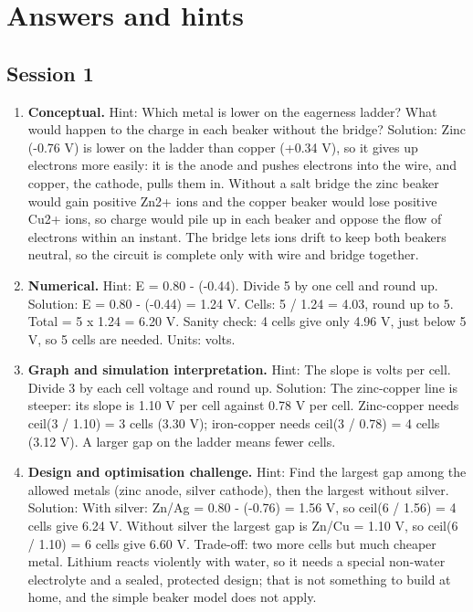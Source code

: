 \documentclass[11pt,a4paper]{article}
\begin{document}
\section{Answers and hints}

\subsection*{Session 1}
\begin{enumerate}[nosep]
\item \textbf{Conceptual.} Hint: Which metal is lower on the eagerness ladder? What would happen to the charge in each beaker without the bridge? Solution: Zinc (-0.76 V) is lower on the ladder than copper (+0.34 V), so it gives up electrons more easily: it is the anode and pushes electrons into the wire, and copper, the cathode, pulls them in. Without a salt bridge the zinc beaker would gain positive Zn2+ ions and the copper beaker would lose positive Cu2+ ions, so charge would pile up in each beaker and oppose the flow of electrons within an instant. The bridge lets ions drift to keep both beakers neutral, so the circuit is complete only with wire and bridge together.
\item \textbf{Numerical.} Hint: E = 0.80 - (-0.44). Divide 5 by one cell and round up. Solution: E = 0.80 - (-0.44) = 1.24 V. Cells: 5 / 1.24 = 4.03, round up to 5. Total = 5 x 1.24 = 6.20 V. Sanity check: 4 cells give only 4.96 V, just below 5 V, so 5 cells are needed. Units: volts.
\item \textbf{Graph and simulation interpretation.} Hint: The slope is volts per cell. Divide 3 by each cell voltage and round up. Solution: The zinc-copper line is steeper: its slope is 1.10 V per cell against 0.78 V per cell. Zinc-copper needs ceil(3 / 1.10) = 3 cells (3.30 V); iron-copper needs ceil(3 / 0.78) = 4 cells (3.12 V). A larger gap on the ladder means fewer cells.
\item \textbf{Design and optimisation challenge.} Hint: Find the largest gap among the allowed metals (zinc anode, silver cathode), then the largest without silver. Solution: With silver: Zn/Ag = 0.80 - (-0.76) = 1.56 V, so ceil(6 / 1.56) = 4 cells give 6.24 V. Without silver the largest gap is Zn/Cu = 1.10 V, so ceil(6 / 1.10) = 6 cells give 6.60 V. Trade-off: two more cells but much cheaper metal. Lithium reacts violently with water, so it needs a special non-water electrolyte and a sealed, protected design; that is not something to build at home, and the simple beaker model does not apply.
\end{enumerate}
\end{document}
